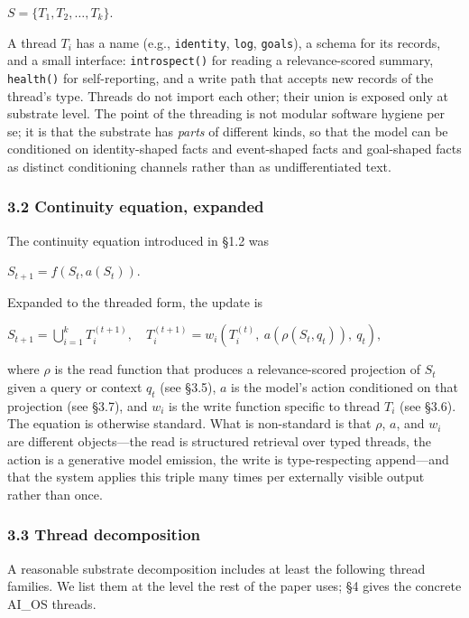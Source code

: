 \documentclass[11pt,letterpaper]{article}
\begin{document}
$S = \{T_1, T_2, \ldots, T_k\}.$

A thread $T_i$ has a name (e.g., \texttt{identity}, \texttt{log}, \texttt{goals}), a schema for its records, and a small interface: \texttt{introspect()} for reading a relevance-scored summary, \texttt{health()} for self-reporting, and a write path that accepts new records of the thread's type. Threads do not import each other; their union is exposed only at substrate level. The point of the threading is not modular software hygiene per se; it is that the substrate has \emph{parts} of different kinds, so that the model can be conditioned on identity-shaped facts and event-shaped facts and goal-shaped facts as distinct conditioning channels rather than as undifferentiated text.

\subsubsection*{3.2 Continuity equation, expanded}

The continuity equation introduced in §1.2 was

$S_{t+1} = f(S_t, a(S_t)).$

Expanded to the threaded form, the update is

$S_{t+1} = \bigcup_{i=1}^{k} T_i^{(t+1)}, \quad T_i^{(t+1)} = w_i\!\left(T_i^{(t)},\ a\!\left(\rho(S_t, q_t)\right),\ q_t\right),$

where $\rho$ is the read function that produces a relevance-scored projection of $S_t$ given a query or context $q_t$ (see §3.5), $a$ is the model's action conditioned on that projection (see §3.7), and $w_i$ is the write function specific to thread $T_i$ (see §3.6). The equation is otherwise standard. What is non-standard is that $\rho$, $a$, and $w_i$ are different objects---the read is structured retrieval over typed threads, the action is a generative model emission, the write is type-respecting append---and that the system applies this triple many times per externally visible output rather than once.

\subsubsection*{3.3 Thread decomposition}

A reasonable substrate decomposition includes at least the following thread families. We list them at the level the rest of the paper uses; §4 gives the concrete AI\_OS threads.
\end{document}
